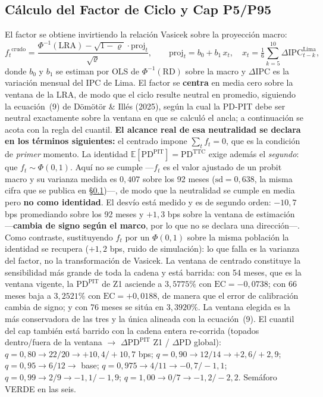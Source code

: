 \documentclass[12pt, a4paper]{article}
\newcommand{\PD}{\ensuremath{\mathrm{PD}}}
\newcommand{\PDTTC}{\ensuremath{\mathrm{PD}^{\mathrm{TTC}}}}
\newcommand{\PDPIT}{\ensuremath{\mathrm{PD}^{\mathrm{PIT}}}}
\newcommand{\RD}{\ensuremath{\mathrm{RD}}}
\newcommand{\LRA}{\ensuremath{\mathrm{LRA}}}
\renewcommand{\rho}{\ensuremath{\varrho}}
\newcommand{\ft}{\ensuremath{f_t}}
\newcommand{\EC}{\ensuremath{\mathrm{EC}}}
\newcommand{\Norm}{\ensuremath{\Phi}}
\begin{document}
\subsection{Cálculo del Factor de Ciclo y Cap P5/P95}
\label{sec:ft}
El factor se obtiene invirtiendo la relación Vasicek sobre la proyección macro:
\begin{equation}
  \ft^{\text{crudo}} = \frac{\Phi^{-1}(\LRA) - \sqrt{1-\rho}\cdot\mathrm{proj}_t}{\sqrt{\rho}},
  \qquad \mathrm{proj}_t = b_0 + b_1\,x_t,\quad
  x_t = \tfrac{1}{6}\sum_{k=5}^{10}\Delta\mathrm{IPC}^{\text{Lima}}_{t-k},
\end{equation}
donde $b_0$ y $b_1$ se estiman por OLS de $\Phi^{-1}(\RD)$ sobre la macro y $\Delta\mathrm{IPC}$ es
la variación mensual del IPC de Lima. El factor se \textbf{centra} en media cero sobre la ventana de
la LRA, de modo que el ciclo resulte neutral en promedio, siguiendo la ecuación~(9) de Dömötör \&
Illés (2025), según la cual la PD-PIT debe ser neutral exactamente sobre la ventana en que se
calculó el ancla; a continuación se acota con la regla del cuantil. \textbf{El alcance real de esa
neutralidad se declara en los términos siguientes:} el centrado impone $\sum_t\ft=0$, que es la
condición de \emph{primer} momento. La identidad
$\mathbb{E}[\PDPIT]=\PDTTC$ exige además el \emph{segundo}: que $\ft\sim\Norm(0,1)$. Aquí no se
cumple ---$\ft$ es el valor ajustado de un probit macro y su varianza medida es $0{,}407$ sobre los
92 meses ($\mathrm{sd}=0{,}638$, la misma cifra que se publica en \S\ref{sec:ft})---, de modo que la
neutralidad se cumple en media pero \textbf{no como identidad}. El desvío está medido y es de
segundo orden: $-10{,}7$ bps promediando sobre los 92 meses y $+1{,}3$ bps sobre la ventana de
estimación ---\textbf{cambia de signo según el marco}, por lo que no se declara una dirección---.
Como contraste, sustituyendo $\ft$ por un $\Norm(0,1)$ sobre la misma población la identidad se
recupera ($+1{,}2$ bps, ruido de simulación): lo que falla es la varianza del factor, no la
transformación de Vasicek. La ventana de centrado constituye la sensibilidad más grande de toda la cadena y está barrida: con
54 meses, que es la ventana vigente, la \PDPIT{} de Z1 asciende a $3{,}5775\%$ con $\EC=-0{,}0738$;
con 66 meses baja a $3{,}2521\%$ con $\EC=+0{,}0188$, de manera que el error de calibración cambia
de signo; y con 76 meses se sitúa en $3{,}3920\%$. La ventana elegida es la más conservadora de las
tres y la única alineada con la ecuación~(9). El cuantil del cap también está barrido con la cadena entera
re-corrida (topados dentro/fuera de la ventana $\to$ $\Delta$\PDPIT{} Z1 / $\Delta$\PD{} global):
$q=0{,}80\to22/20\to+10{,}4/+10{,}7$ bps; $q=0{,}90\to12/14\to+2{,}6/+2{,}9$;
$q=0{,}95\to6/12\to$ base; $q=0{,}975\to4/11\to-0{,}7/-1{,}1$; $q=0{,}99\to2/9\to-1{,}1/-1{,}9$;
$q=1{,}00\to0/7\to-1{,}2/-2{,}2$. Semáforo VERDE en las seis.
\end{document}
